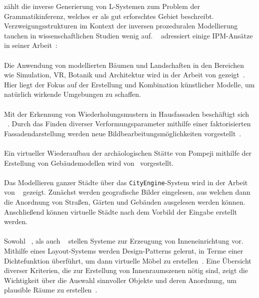 \citeauthor{higuera_2010} zählt die inverse Generierung von L-Systemen zum Problem der Grammatikinferenz, welches er
als gut erforschtes Gebiet beschreibt.
Verzweigungsstrukturen im Kontext der inversen prozeduralen Modellierung tauchen in wissenschaftlichen Studien wenig auf.
~\citeauthor{guo_2020} adressiert einige IPM-Ansätze in seiner Arbeit~\cite{guo_2020}:\\~\\
Die Anwendung von modellierten Bäumen und Landschaften in den Bereichen wie Simulation, VR, Botanik und Architektur
wird in der Arbeit von \citeauthor{deussen_2010} gezeigt~\cite{deussen_2010}.
Hier liegt der Fokus auf der Erstellung und Kombination künstlicher Modelle, um natürlich wirkende Umgebungen zu
schaffen.\\~\\
Mit der Erkennung von Wiederholungsmustern in Hausfassaden beschäftigt sich\\~\citeauthor{alhalawani_2013}.
Durch das Finden diverser Verformungsparameter mithilfe einer faktorisierten Fassadendarstellung werden neue
Bildbearbeitungsmöglichkeiten  vorgestellt~\cite{alhalawani_2013}.\\~\\
Ein virtueller Wiederaufbau der archäologischen Stätte von Pompeji mithilfe der Erstellung von Gebäudemodellen wird
von~\citeauthor{mueller_2006} vorgestellt.\\~\\
Das Modellieren ganzer Städte über das \texttt{CityEngine}-System wird in der Arbeit von ~\citeauthor{parish_2001}
gezeigt.
Zunächst werden geografische Bilder eingelesen, aus welchen dann die Anordnung von Straßen, Gärten und Gebäuden
ausgelesen werden können.
Anschließend können virtuelle Städte nach dem Vorbild der Eingabe erstellt werden.\\~\\
Sowohl ~\citeauthor{merrell_2011}, als auch ~\citeauthor{zhang_2019} stellen Systeme zur Erzeugung von Inneneinrichtung
vor.
Mithilfe eines Layout-Systems werden Design-Patterns gelernt, in Terme einer Dichtefunktion überführt, um dann virtuelle
Möbel zu erstellen~\cite{merrell_2011}.
Eine Übersicht diverser Kriterien, die zur Erstellung von Innenraumszenen nötig sind, zeigt die
Wichtigkeit über die Auswahl sinnvoller Objekte und deren Anordnung, um plausible Räume zu erstellen~\cite{zhang_2019}.

\newpage

